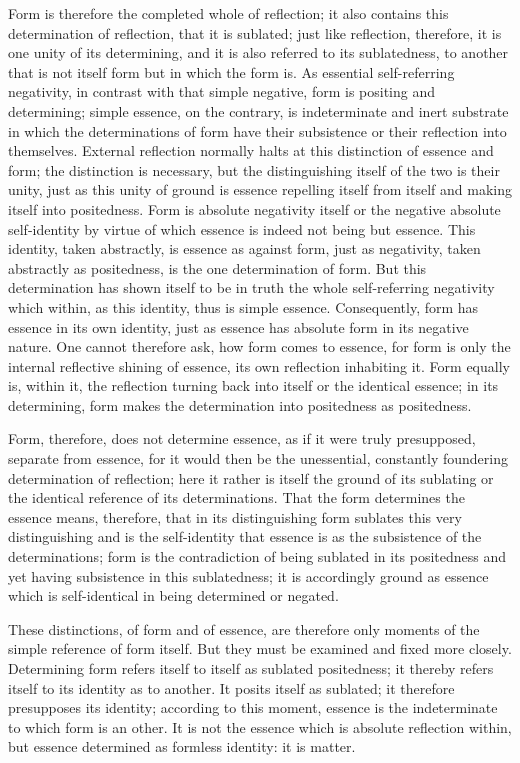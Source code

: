 Form is therefore the completed whole of reflection;
it also contains this determination of reflection, that it is sublated;
just like reflection, therefore, it is one unity of its determining,
and it is also referred to its sublatedness,
to another that is not itself form but in which the form is.
As essential self-referring negativity,
in contrast with that simple negative,
form is positing and determining;
simple essence, on the contrary, is indeterminate and inert
substrate in which the determinations of form have their subsistence
or their reflection into themselves.
External reflection normally halts at
this distinction of essence and form;
the distinction is necessary,
but the distinguishing itself of the two is their unity,
just as this unity of ground is essence repelling itself from itself
and making itself into positedness.
Form is absolute negativity itself
or the negative absolute self-identity
by virtue of which essence is indeed not being but essence.
This identity, taken abstractly, is essence as against form,
just as negativity, taken abstractly as positedness,
is the one determination of form.
But this determination has shown itself to be in truth
the whole self-referring negativity
which within, as this identity, thus is simple essence.
Consequently, form has essence in its own identity,
just as essence has absolute form in its negative nature.
One cannot therefore ask, how form comes to essence,
for form is only the internal reflective shining of essence,
its own reflection inhabiting it.
Form equally is, within it,
the reflection turning back into itself
or the identical essence;
in its determining, form makes the determination
into positedness as positedness.

Form, therefore, does not determine essence,
as if it were truly presupposed, separate from essence,
for it would then be the unessential,
constantly foundering determination of reflection;
here it rather is itself the ground of its sublating
or the identical reference of its determinations.
That the form determines the essence means, therefore,
that in its distinguishing form sublates this very distinguishing
and is the self-identity that essence is
as the subsistence of the determinations;
form is the contradiction of being sublated in its positedness
and yet having subsistence in this sublatedness;
it is accordingly ground as essence which
is self-identical in being determined or negated.

These distinctions, of form and of essence,
are therefore only moments of the simple reference of form itself.
But they must be examined and fixed more closely.
Determining form refers itself to itself as sublated positedness;
it thereby refers itself to its identity as to another.
It posits itself as sublated;
it therefore presupposes its identity;
according to this moment, essence is the indeterminate
to which form is an other.
It is not the essence which is absolute reflection within,
but essence determined as formless identity:
it is matter.

